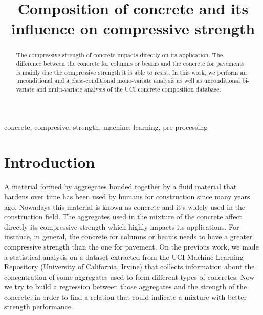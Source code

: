 \documentclass[conference]{IEEEtran}
\begin{document}
\title{Composition of concrete and its influence on compressive strength\\
}

\author{
\and
{}
}

\maketitle

\begin{abstract}
The compressive strength of concrete impacts directly on its application. The difference between the concrete for columns or beams and the concrete for pavements is mainly due the compressive strength it is able to resist. In this work, we perform an unconditional and a class-conditional mono-variate analysis as well as unconditional bi-variate and multi-variate analysis of the UCI concrete composition database.
\end{abstract}

\begin{IEEEkeywords}
concrete, compresive, strength, machine, learning, pre-processing
\end{IEEEkeywords}

\section{Introduction}
A material formed by aggregates bonded together by a fluid material that hardens over time has been used by humans for construction since many years ago\cite{b3}. Nowadays this material is known as concrete and it's widely used in the construction field. The aggregates used in the mixture of the concrete affect directly its compressive strength which highly impacts its applications. For instance, in general, the concrete for columns or beams needs to have a greater compressive strength than the one for pavement. On the previous work, we made a statistical analysis on a dataset extracted from the UCI Machine Learning Repository (University of California, Irvine)\cite{b4} that collects information about the concentration of some aggregates used to form different types of concretes. Now we try to build a regression between those aggregates and the strength of the concrete, in order to find a relation that could indicate a mixture with better strength performance.
\end{document}
